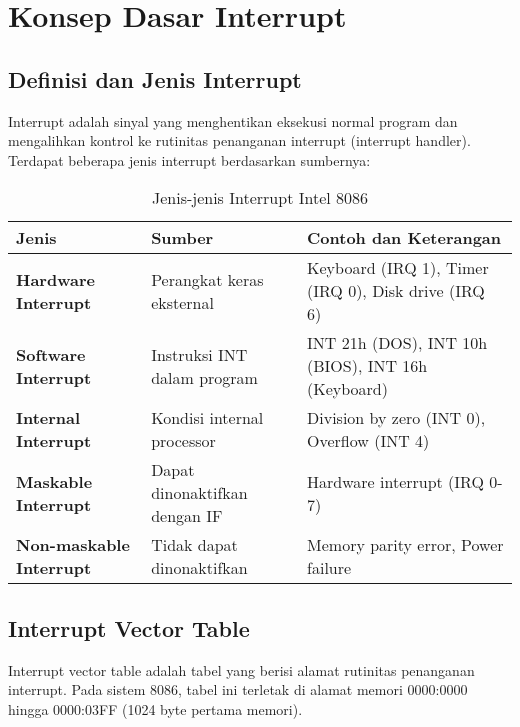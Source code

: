 \documentclass[../main.tex]{subfiles}
\begin{document}
    \section{Konsep Dasar Interrupt}
        \subsection{Definisi dan Jenis Interrupt}
            Interrupt adalah sinyal yang menghentikan eksekusi normal program dan mengalihkan kontrol ke rutinitas penanganan interrupt (interrupt handler). Terdapat beberapa jenis interrupt berdasarkan sumbernya:
            
            \begin{table}[H]
                \centering
                \caption{Jenis-jenis Interrupt Intel 8086}
                \begin{tabular}{|p{2.5cm}|p{3.5cm}|p{7cm}|}
                    \hline
                    \textbf{Jenis} & \textbf{Sumber} & \textbf{Contoh dan Keterangan} \\
                    \hline
                    \textbf{Hardware Interrupt} & Perangkat keras eksternal & Keyboard (IRQ 1), Timer (IRQ 0), Disk drive (IRQ 6) \\
                    \hline
                    \textbf{Software Interrupt} & Instruksi INT dalam program & INT 21h (DOS), INT 10h (BIOS), INT 16h (Keyboard) \\
                    \hline
                    \textbf{Internal Interrupt} & Kondisi internal processor & Division by zero (INT 0), Overflow (INT 4) \\
                    \hline
                    \textbf{Maskable Interrupt} & Dapat dinonaktifkan dengan IF & Hardware interrupt (IRQ 0-7) \\
                    \hline
                    \textbf{Non-maskable Interrupt} & Tidak dapat dinonaktifkan & Memory parity error, Power failure \\
                    \hline
                \end{tabular}
            \end{table}

        \subsection{Interrupt Vector Table}
            Interrupt vector table adalah tabel yang berisi alamat rutinitas penanganan interrupt. Pada sistem 8086, tabel ini terletak di alamat memori 0000:0000 hingga 0000:03FF (1024 byte pertama memori).
            
\end{document}
